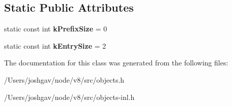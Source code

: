 \subsection*{Static Public Attributes}
\begin{DoxyCompactItemize}
\item 
static const int {\bfseries k\+Prefix\+Size} = 0\hypertarget{classv8_1_1internal_1_1_compilation_cache_shape_a2854205f345fada271ceb5dcc695cd05}{}\label{classv8_1_1internal_1_1_compilation_cache_shape_a2854205f345fada271ceb5dcc695cd05}

\item 
static const int {\bfseries k\+Entry\+Size} = 2\hypertarget{classv8_1_1internal_1_1_compilation_cache_shape_a9644cdffa86339e9b0e5694affd27a3b}{}\label{classv8_1_1internal_1_1_compilation_cache_shape_a9644cdffa86339e9b0e5694affd27a3b}

\end{DoxyCompactItemize}


The documentation for this class was generated from the following files\+:\begin{DoxyCompactItemize}
\item 
/\+Users/joshgav/node/v8/src/objects.\+h\item 
/\+Users/joshgav/node/v8/src/objects-\/inl.\+h\end{DoxyCompactItemize}
